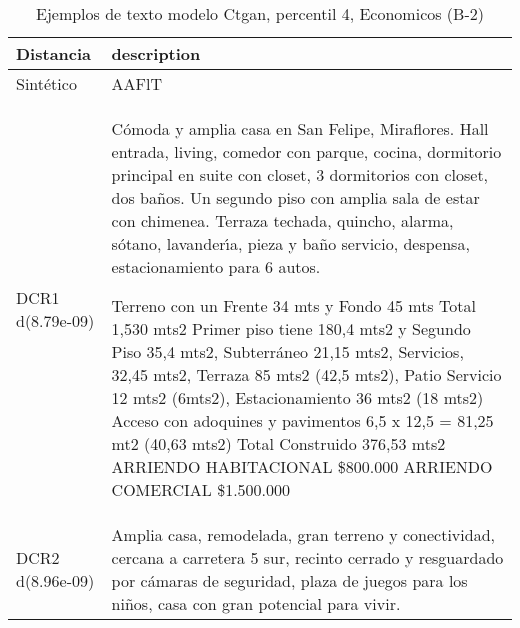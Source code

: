 \begin{table}[H]
\centering
\fontsize{10}{14}\selectfont
\caption{Ejemplos de texto modelo Ctgan, percentil 4, Economicos (B-2)}
\label{table-example-economicos-b-2-ctgan-4p-text}
\begin{tabular}{|l|m{35em}|}
\hline
\rowcolor[gray]{0.8}
Distancia & description \\
\hline Sintético & AAFlT \\
\hline DCR1 d(8.79e-09) & C\'omoda y amplia casa en San Felipe, Miraflores.
Hall entrada, living, comedor con parque, cocina, dormitorio principal en suite con closet, 3 dormitorios con closet, dos ba\~nos. Un segundo piso con amplia sala de estar con chimenea.
Terraza techada, quincho, alarma, s\'otano, lavander{\'\i}a, pieza y ba\~no servicio, despensa, estacionamiento para 6 autos.

Terreno con un Frente 34 mts y Fondo 45 mts Total 1,530 mts2
Primer piso tiene 180,4 mts2 y Segundo Piso 35,4 mts2, Subterr\'aneo 21,15 mts2, Servicios, 32,45 mts2, Terraza 85 mts2 (42,5 mts2), Patio Servicio 12 mts2 (6mts2), Estacionamiento 36 mts2 (18 mts2)
Acceso con adoquines y pavimentos 6,5 x 12,5 = 81,25 mt2 (40,63 mts2)
Total Construido 376,53 mts2
ARRIENDO HABITACIONAL \$800.000
ARRIENDO COMERCIAL \$1.500.000
 \\
\hline DCR2 d(8.96e-09) & Amplia casa, remodelada, gran terreno y conectividad, cercana a carretera 5 sur, recinto cerrado y resguardado por c\'amaras de seguridad, plaza de juegos para los ni\~nos, casa con gran potencial para vivir. \\
\hline
\end{tabular}
\end{table}
